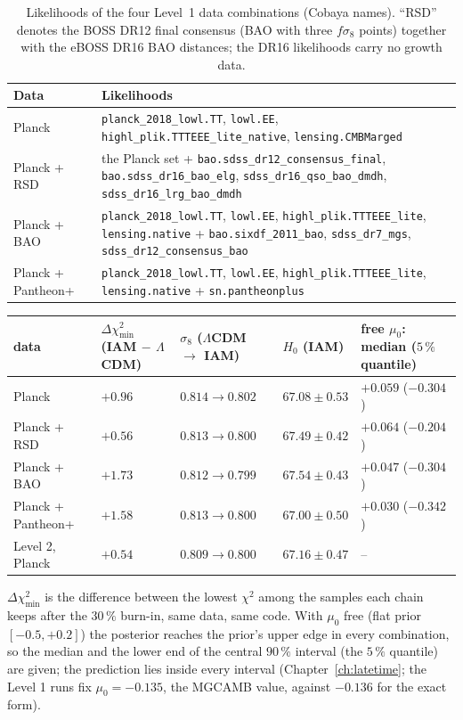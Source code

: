 \begin{table}[htbp]\centering\small
\caption[Likelihoods of the four data combinations]{Likelihoods of the four Level~1 data combinations (Cobaya names). ``RSD'' denotes the BOSS DR12
final consensus (BAO with three $f\sigma_8$ points) together with the eBOSS DR16 BAO distances; the DR16 likelihoods carry no growth data.
\measured}\label{tab:chain_likelihoods}
\begin{tabularx}{\linewidth}{l>{\raggedright\arraybackslash}X}\toprule
Data & Likelihoods\\\midrule
Planck & \texttt{planck\_2018\_lowl.TT}, \texttt{lowl.EE}, \texttt{highl\_plik.TTTEEE\_lite\_native}, \texttt{lensing.CMBMarged}\\
Planck + RSD & the Planck set + \texttt{bao.sdss\_dr12\_consensus\_final}, \texttt{bao.sdss\_dr16\_bao\_elg}, \texttt{sdss\_dr16\_qso\_bao\_dmdh}, \texttt{sdss\_dr16\_lrg\_bao\_dmdh}\\
Planck + BAO & \texttt{planck\_2018\_lowl.TT}, \texttt{lowl.EE}, \texttt{highl\_plik.TTTEEE\_lite}, \texttt{lensing.native} + \texttt{bao.sixdf\_2011\_bao}, \texttt{sdss\_dr7\_mgs}, \texttt{sdss\_dr12\_consensus\_bao}\\
Planck + Pantheon+ & \texttt{planck\_2018\_lowl.TT}, \texttt{lowl.EE}, \texttt{highl\_plik.TTTEEE\_lite}, \texttt{lensing.native} + \texttt{sn.pantheonplus}\\\bottomrule
\end{tabularx}
\end{table}

\begin{center}
\small
\begin{tabularx}{\linewidth}{@{}l>{\centering\arraybackslash}X>{\centering\arraybackslash}X>{\centering\arraybackslash}X>{\centering\arraybackslash}X@{}}
\toprule
data & $\Delta\chi^2_{\min}$ (IAM $-$ $\Lambda$CDM) & $\sigma_8$ ($\Lambda$CDM $\to$ IAM) & $H_0$ (IAM) & free $\mu_0$: median ($5\,\%$ quantile) \\
\midrule
Planck            & $+0.96$ & $0.814\to0.802$ & $67.08\pm0.53$ & $+0.059$ ($-0.304$) \\
Planck + RSD      & $+0.56$ & $0.813\to0.800$ & $67.49\pm0.42$ & $+0.064$ ($-0.204$) \\
Planck + BAO      & $+1.73$ & $0.812\to0.799$ & $67.54\pm0.43$ & $+0.047$ ($-0.304$) \\
Planck + Pantheon+ & $+1.58$ & $0.813\to0.800$ & $67.00\pm0.50$ & $+0.030$ ($-0.342$) \\
\midrule
Level 2, Planck   & $+0.54$ & $0.809\to0.800$ & $67.16\pm0.47$ & -- \\
\bottomrule
\end{tabularx}
\end{center}
$\Delta\chi^2_{\min}$ is the difference between the lowest $\chi^2$ among the samples each chain keeps after the $30\,\%$ burn-in, same data, same code. With $\mu_0$ free (flat prior $[-0.5,+0.2]$) the posterior reaches the prior's upper edge in every combination, so the median and the lower end of the central $90\,\%$ interval (the $5\,\%$ quantile) are given; the prediction lies inside every interval (Chapter~\ref{ch:latetime}; the Level 1 runs fix $\mu_0=-0.135$, the MGCAMB value, against $-0.136$ for the exact form).

